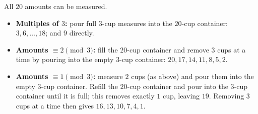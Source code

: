 All $\boxed{20}$ amounts can be measured.
\begin{itemize}
\item \textbf{Multiples of $3$:} pour full $3$-cup measures into the $20$-cup container: $3,6,\dots,18$; and $9$ directly.
\item \textbf{Amounts $\equiv2\pmod3$:} fill the $20$-cup container and remove $3$ cups at a time by pouring into the empty $3$-cup container: $20,17,14,11,8,5,2$.
\item \textbf{Amounts $\equiv1\pmod3$:} measure $2$ cups (as above) and pour them into the empty $3$-cup container. Refill the $20$-cup container and pour into the $3$-cup container until it is full; this removes exactly $1$ cup, leaving $19$. Removing $3$ cups at a time then gives $16,13,10,7,4,1$.
\end{itemize}

